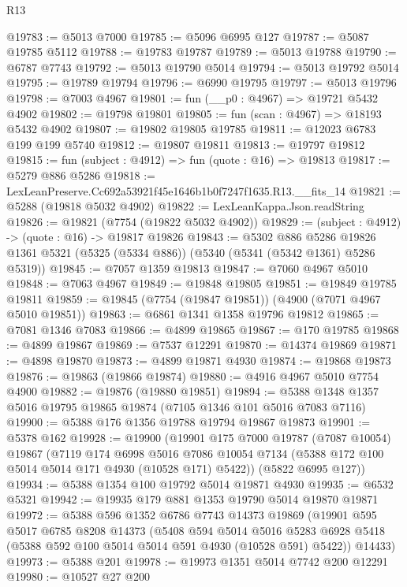 \begin{lexlean}{R13}
\begin{coremodule}
@19783 := @5013 @7000
@19785 := @5096 @6995 @127
@19787 := @5087 @19785 @5112
@19788 := @19783 @19787
@19789 := @5013 @19788
@19790 := @6787 @7743
@19792 := @5013 @19790 @5014
@19794 := @5013 @19792 @5014
@19795 := @19789 @19794
@19796 := @6990 @19795
@19797 := @5013 @19796
@19798 := @7003 @4967
@19801 := fun (__p0 : @4967) => @19721 @5432 @4902
@19802 := @19798 @19801
@19805 := fun (scan : @4967) => @18193 @5432 @4902
@19807 := @19802 @19805 @19785
@19811 := @12023 @6783 @199 @199 @5740
@19812 := @19807 @19811
@19813 := @19797 @19812
@19815 := fun (subject : @4912) => fun (quote : @16) => @19813
@19817 := @5279 @886 @5286
@19818 := LexLeanPreserve.Cc692a53921f45e1646b1b0f7247f1635.R13.__fits_14
@19821 := @5288 (@19818 @5032 @4902)
@19822 := LexLeanKappa.Json.readString
@19826 := @19821 (@7754 (@19822 @5032 @4902))
@19829 := (subject : @4912) -> (quote : @16) -> @19817 @19826
@19843 := @5302
    @886
    @5286
    @19826
    @1361
    @5321
    (@5325 (@5334 @886))
    (@5340 (@5341 (@5342 @1361) @5286 @5319))
@19845 := @7057 @1359 @19813
@19847 := @7060 @4967 @5010
@19848 := @7063 @4967
@19849 := @19848 @19805
@19851 := @19849 @19785 @19811
@19859 := @19845 (@7754 (@19847 @19851)) (@4900 (@7071 @4967 @5010 @19851))
@19863 := @6861 @1341 @1358 @19796 @19812
@19865 := @7081 @1346 @7083
@19866 := @4899 @19865
@19867 := @170 @19785
@19868 := @4899 @19867
@19869 := @7537 @12291
@19870 := @14374 @19869
@19871 := @4898 @19870
@19873 := @4899 @19871 @4930
@19874 := @19868 @19873
@19876 := @19863 (@19866 @19874)
@19880 := @4916 @4967 @5010 @7754 @4900
@19882 := @19876 (@19880 @19851)
@19894 := @5388 @1348 @1357 @5016 @19795 @19865 @19874 (@7105 @1346 @101 @5016 @7083 @7116)
@19900 := @5388 @176 @1356 @19788 @19794 @19867 @19873
@19901 := @5378 @162
@19928 := @19900
    (@19901
      @175
      @7000
      @19787
      (@7087 @10054)
      @19867
      (@7119
        @174
        @6998
        @5016
        @7086
        @10054
        @7134
        (@5388 @172 @100 @5014 @5014 @171 @4930 (@10528 @171) @5422))
      (@5822 @6995 @127))
@19934 := @5388 @1354 @100 @19792 @5014 @19871 @4930
@19935 := @6532 @5321
@19942 := @19935 @179 @881 @1353 @19790 @5014 @19870 @19871
@19972 := @5388
    @596
    @1352
    @6786
    @7743
    @14373
    @19869
    (@19901
      @595
      @5017
      @6785
      @8208
      @14373
      (@5408
        @594
        @5014
        @5016
        @5283
        @6928
        @5418
        (@5388 @592 @100 @5014 @5014 @591 @4930 (@10528 @591) @5422))
      @14433)
@19973 := @5388 @201
@19978 := @19973 @1351 @5014 @7742 @200 @12291
@19980 := @10527 @27 @200

\end{coremodule}
\end{lexlean}
